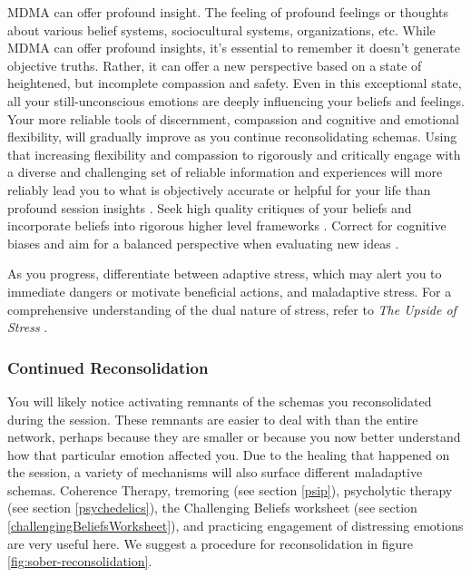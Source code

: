\documentclass[12pt,letterpaper]{article}
\begin{document}
MDMA can offer profound insight. The feeling of profound feelings or thoughts about various belief systems, sociocultural systems, organizations, etc. While MDMA can offer profound insights, it's essential to remember it doesn't generate objective truths. Rather, it can offer a new perspective based on a state of heightened, but incomplete compassion and safety. Even in this exceptional state, all your still-unconscious emotions are deeply influencing your beliefs and feelings. Your more reliable tools of discernment, compassion and cognitive and emotional flexibility, will gradually improve as you continue reconsolidating schemas. Using that increasing flexibility and compassion to rigorously and critically engage with a diverse and challenging set of reliable information and experiences will more reliably lead you to what is objectively accurate or helpful for your life than profound session insights \cite{bentzMindfulInquiry}. Seek high quality critiques of your beliefs and incorporate beliefs into rigorous higher level frameworks \cite{saganDemon}. Correct for cognitive biases and aim for a balanced perspective when evaluating new ideas \cite{galefScoutMindset}.  

As you progress, differentiate between adaptive stress, which may alert you to immediate dangers or motivate beneficial actions, and maladaptive stress. For a comprehensive understanding of the dual nature of stress, refer to \textit{The Upside of Stress} \cite{mcgonigalStress}.  
\subsubsection{Continued Reconsolidation}
You will likely notice activating remnants of the schemas you reconsolidated during the session. These remnants are easier to deal with than the entire network, perhaps because they are smaller or because you now better understand how that particular emotion affected you. Due to the healing that happened on the session, a variety of mechanisms will also surface different maladaptive schemas. Coherence Therapy, tremoring (see section \ref{psip}), psycholytic therapy (see section \ref{psychedelics}), the Challenging Beliefs worksheet (see section \ref{challengingBeliefsWorksheet}), and practicing engagement of distressing emotions are very useful here. We suggest a procedure for reconsolidation in figure \ref{fig:sober-reconsolidation}.
\end{document}
